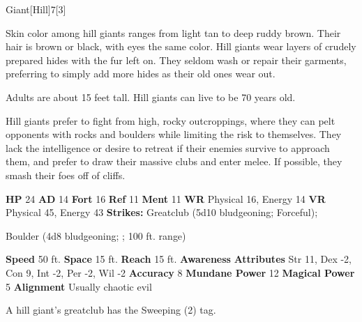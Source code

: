   \begin{monsection}{Giant}[Hill]{7}[3]
    \vspace{-1em}\vspace{-1em}
    \vspace{0em}

    
      Skin color among hill giants ranges from light tan to deep ruddy brown. Their hair is brown or black, with eyes the same color. Hill giants wear layers of crudely prepared hides with the fur left on. They seldom wash or repair their garments, preferring to simply add more hides as their old ones wear out.

      Adults are about 15 feet tall. Hill giants can live to be 70 years old.
    
      Hill giants prefer to fight from high, rocky outcroppings, where they can pelt opponents with rocks and boulders while limiting the risk to themselves.
      They lack the intelligence or desire to retreat if their enemies survive to approach them, and prefer to draw their massive clubs and enter melee.
      If possible, they smash their foes off of cliffs.
    

    \begin{spellcontent}
      \begin{spelltargetinginfo}
        \pari \textbf{HP} 24 \monsep
          \textbf{AD} 14 \monsep
          \textbf{Fort} 16 \monsep
          \textbf{Ref} 11 \monsep
          \textbf{Ment} 11
        \pari \textbf{WR} Physical 16, Energy 14 \monsep
        \textbf{VR} Physical 45, Energy 43
        \pari \textbf{Strikes:}
            Greatclub  (5d10 bludgeoning; Forceful);
\par Boulder  (4d8 bludgeoning; ; 100 ft. range)
      \end{spelltargetinginfo}
    \end{spellcontent}
    \begin{monsterfooter}
      \pari \textbf{Speed} 50 ft. \monsep
        \textbf{Space} 15 ft. \monsep
        \textbf{Reach} 15 ft.
      \pari \textbf{Awareness} 
      \pari \textbf{Attributes}
        Str 11, Dex -2,
        Con 9, Int -2,
        Per -2, Wil -2
      \pari \textbf{Accuracy} 8 \monsep
        \textbf{Mundane Power} 12 \monsep
      \textbf{Magical Power} 5
      \pari \textbf{Alignment} Usually chaotic evil
    \end{monsterfooter}
  \end{monsection}
   A hill giant's greatclub has the Sweeping (2) tag.
  
